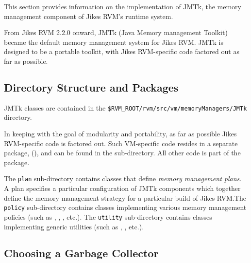 
This section provides information on the implementation of JMTk, the
memory management component of Jikes\TMweb{} RVM's runtime system.

From Jikes RVM 2.2.0 onward, JMTk (Java Memory management
Toolkit) became the default memory management system for Jikes RVM.\@
JMTk is designed to be a portable toolkit, with Jikes
RVM-specific code factored out as far as possible.

\subsection{Directory Structure and Packages} \label{sssec:directories}

JMTk classes are contained in the
\texttt{\$RVM\_\-ROOT/rvm/src/vm/memoryManagers/JMTk} directory.

In keeping with the goal of modularity and portability, as far as
possible Jikes RVM-specific code is factored out.  Such VM-specific
code resides in a separate package,
(),
and can be found in the \texttt{\vmInterface} sub-directory.  All other
code is part of the
package.

The \texttt{plan} sub-directory contains classes that define
\emph{memory management plans}.  A plan specifies a particular
configuration of JMTk components which together define the memory
management strategy for a particular build of Jikes RVM.\@  The
\texttt{policy} sub-directory contains classes implementing various
memory management policies (such as , , , etc.).  The \texttt{utility}
sub-directory contains classes implementing generic utilities (such as
,
, etc.).

\subsection{Choosing a Garbage Collector} \label{ssec:choosinggc}


